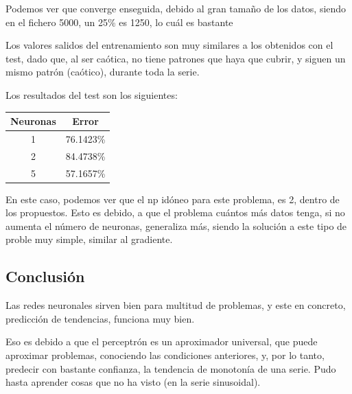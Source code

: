 \documentclass[12pt]{article}
\begin{document}
 Podemos ver que converge enseguida, debido al gran tamaño de los datos, siendo en el fichero 5000, un 25\% es 1250, lo cuál es bastante

Los valores salidos del entrenamiento son muy similares a los obtenidos con el test, dado que, al ser caótica, no tiene patrones que haya que cubrir, y siguen un mismo patrón (caótico), durante toda la serie.

Los resultados del test son los siguientes:
\begin{center}
	\begin{tabular}{| c | c |}
		\hline
		Neuronas & Error \\ \hline
        1 & 76.1423\% \\ \hline
		2 & 84.4738\% \\ \hline
		5 & 57.1657\% \\ \hline
	\end{tabular}
\end{center}

En este caso, podemos ver que el np idóneo para este problema, es 2, dentro de los propuestos. Esto es debido, a que el problema cuántos más datos tenga, si no aumenta el número de neuronas, generaliza más, siendo la solución a este tipo de proble muy simple, similar al gradiente.

\subsection{Conclusión}
Las redes neuronales sirven bien para multitud de problemas, y este en concreto, predicción de tendencias, funciona muy bien.

Eso es debido a que el perceptrón es un aproximador universal, que puede aproximar problemas, conociendo las condiciones anteriores, y, por lo tanto, predecir con bastante confianza, la tendencia de monotonía de una serie. Pudo hasta aprender cosas que no ha visto (en la serie sinusoidal).
\end{document}
